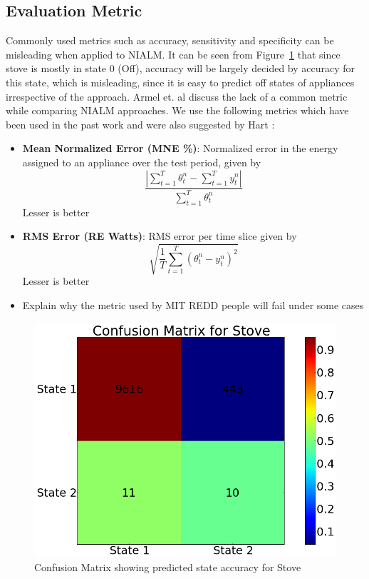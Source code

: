 \documentclass[conference]{IEEEtran}
\newcommand{\figref}[1]{Figure~\ref{#1}}
\begin{document}
\subsection{Evaluation Metric}

Commonly used metrics such as accuracy, sensitivity and specificity can be misleading when applied to NIALM. It can be seen from \figref{fig:confusion} that since stove is mostly in state 0 (Off), accuracy will be largely decided by accuracy for this state, which is misleading, since it is easy to predict off states of appliances irrespective of the approach. Armel et. al \cite{survey1} discuss the lack of a common metric while comparing NIALM approaches. We use the following metrics which have been used in the past work \cite{parson2012_aaai,redd} and were also suggested by Hart \cite{hart}:
\begin{itemize}
\item \textbf{Mean Normalized Error (MNE \%)}: Normalized error in the energy assigned to an appliance over the test period, given by 
$$\frac{|\sum\limits_{t=1}^{T}\theta_t^n- \sum\limits_{t=1}^{T}y_t^n|}{\sum\limits_{t=1}^{T}\theta_t^n} $$
Lesser is better

\item \textbf{RMS Error (RE Watts)}: RMS error per time slice given by
$$\sqrt{\frac{1}{T}\sum\limits_{t=1}^{T}(\theta_t^n-y_t^n)^2}$$
Lesser is better
\item Explain why the metric used by MIT REDD people will fail under some cases
\end{itemize} 
\begin{figure}
\centering \includegraphics[scale=0.2]{./figures/confusion_stove.png}
\caption{Confusion Matrix showing predicted state accuracy for Stove}
   \label{fig:confusion}
\end{figure}
\end{document}
